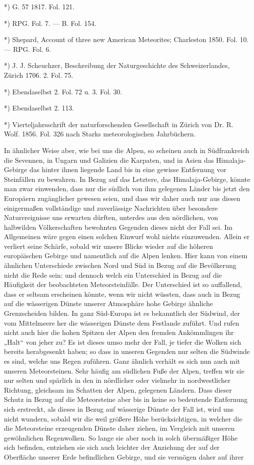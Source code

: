 \documentclass[a4paper, 8pt, oneside, polutonikogreek, german]{article}
\begin{document}
*) G. 57 1817. Fol. 121.

*) RPG. Fol. 7. — B. Fol. 154.

*) Shepard, Account of three new American Meteorites; Charleston 1850. Fol. 10. — RPG. Fol. 6.

*) J. J. Scheuchzer, Beschreibung der Naturgeschichte des Schweizerlandes, Zürich 1706. 2. Fol. 75.

*) Ebendaselbst 2. Fol. 72 u. 3. Fol. 30.

*) Ebendaselbst 2. 113.

*) Vierteljahrsschrift der naturforschenden Gesellschaft in Zürich von Dr. R. Wolf. 1856. Fol. 326 nach Starks meteorologischen Jahrbüchern.

In ähnlicher Weise aber, wie bei uns die Alpen, so scheinen auch in Südfrankreich die Sevennen, in Ungarn und Galizien die Karpaten, und in Asien das Himalaja-Gebirge das hinter ihnen liegende Land bis in eine gewisse Entfernung vor Steinfällen zu bewahren. In Bezug auf das Letztere, das Himalaja-Gebirge, könnte man zwar einwenden, dass nur die südlich von ihm gelegenen Länder bis jetzt den Europäern zugänglicher gewesen seien, und dass wir daher auch nur aus diesen einigermaßen vollständige und zuverlässige Nachrichten über besondere Naturereignisse uns erwarten dürften, unterdes aus den nördlichen, von halbwilden Völkerschaften bewohnten Gegenden dieses nicht der Fall sei. Im Allgemeinen wäre gegen einen solchen Einwurf wohl nichts einzuwenden. Allein er verliert seine Schärfe, sobald wir unsere Blicke wieder auf die höheren europäischen Gebirge und namentlich auf die Alpen lenken. Hier kann von einem ähnlichen Unterschiede zwischen Nord und Süd in Bezug auf die Bevölkerung nicht die Rede sein: und dennoch welch ein Unterschied in Bezug auf die Häufigkeit der beobachteten Meteorsteinfälle. Der Unterschied ist so auffallend, dass er seltsam erscheinen könnte, wenn wir nicht wüssten, dass auch in Bezug auf die wässerigen Dünste unserer Atmosphäre hohe Gebirge ähnliche Grenzscheiden bilden. In ganz Süd-Europa ist es bekanntlich der Südwind, der vom Mittelmeere her die wässerigen Dünste dem Festlande zuführt. Und rufen nicht auch hier die hohen Spitzen der Alpen den fremden Ankömmlingen ihr „Halt“ von jeher zu? Es ist dieses umso mehr der Fall, je tiefer die Wolken sich bereits herabgesenkt haben; so dass in unseren Gegenden nur selten die Südwinde es sind, welche uns Regen zuführen. Ganz ähnlich verhält es sich nun auch mit unseren Meteorsteinen. Sehr häufig am südlichen Fuße der Alpen, treffen wir sie nur selten und spärlich in den in nördlicher oder vielmehr in nordwestlicher Richtung, gleichsam im Schatten der Alpen, gelegenen Ländern. Dass dieser Schutz in Bezug auf die Meteorsteine aber bis in keine so bedeutende Entfernung sich erstreckt, als dieses in Bezug auf wässerige Dünste der Fall ist, wird uns nicht wundern, sobald wir die weil größere Höhe berücksichtigen, in welcher die die Meteorsteine erzeugenden Dünste daher ziehen, im Vergleich mit unseren gewöhnlichen Regenwolken. So lange sie aber noch in solch übermäßiger Höhe sich befinden, entziehen sie sich auch leichter der Anziehung der auf der Oberfläche unserer Erde befindlichen Gebirge, und sie vermögen daher auf ihrer 
\end{document}
